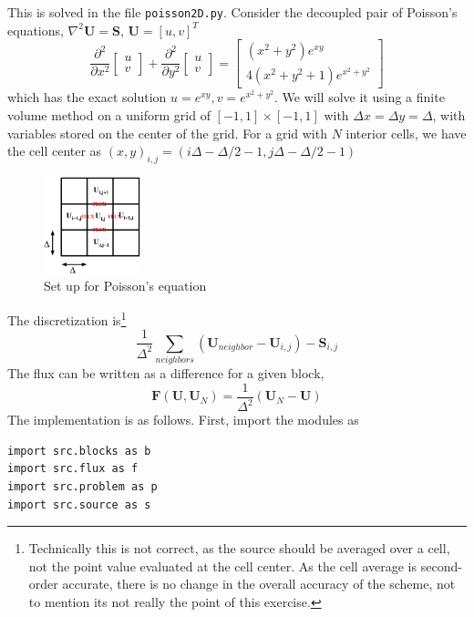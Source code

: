 \documentclass[11pt]{article}
\begin{document}
This is solved in the file \lstinline{poisson2D.py}. Consider the decoupled pair of Poisson's equations, $\nabla^2 \mathbf{U} = \mathbf{S}$, $\mathbf{U} = [u,v]^T$
\begin{equation}
\frac{\partial^2}{\partial x^2}\left[ \begin{array}{c} u \\ v \end{array}\right] + \frac{\partial^2}{\partial y^2}\left[ \begin{array}{c} u \\ v \end{array}\right]  = \left[ \begin{array}{c} (x^2+y^2)e^{xy} \\ 4(x^2+y^2+1)e^{x^2+y^2}  \end{array}\right]
\end{equation}
which has the exact solution $u = e^{xy}, v = e^{x^2+y^2}$. We will solve it using a finite volume method on a uniform grid of $[-1,1]\times[-1,1]$ with $\Delta x = \Delta y = \Delta$, with variables stored on the center of the grid. For a grid with $N$ interior cells, we have the cell center as $(x,y)_{i,j} = (i\Delta-\Delta/2-1, j\Delta-\Delta/2-1)$
\begin{figure}
\centering
\includegraphics[width=0.25\textwidth]{poisson.pdf}
\caption{Set up for Poisson's equation}
\end{figure}
The discretization is\footnote{Technically this is not correct, as the source should be averaged over a cell, not the point value evaluated at the cell center. As the cell average is second-order accurate, there is no change in the overall accuracy of the scheme, not to mention its not really the point of this exercise.}
\begin{equation}
\frac{1}{\Delta^2}\sum_{neighbors} (\mathbf{U}_{neighbor}-\mathbf{U}_{i,j}) - \mathbf{S}_{i,j}
\end{equation}
The flux can be written as a difference for a given block,
\begin{equation}
\mathbf{F}(\mathbf{U},\mathbf{U}_N) = \frac{1}{\Delta^2}(\mathbf{U}_N - \mathbf{U})
\end{equation}
The implementation is as follows. First, import the modules as
\begin{lstlisting}
import src.blocks as b
import src.flux as f
import src.problem as p
import src.source as s
\end{lstlisting}
\end{document}

